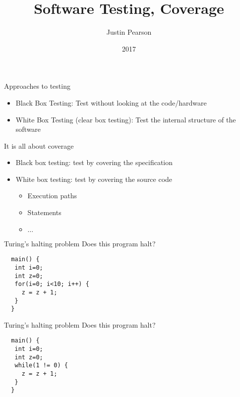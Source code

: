 \documentclass{beamer}
\title{Software Testing, Coverage}
\author{Justin Pearson}
\date{2017}
\begin{document}
\lstset{language=C}

\begin{frame}
  \maketitle
\end{frame}

\begin{frame}{Approaches to testing}
  \begin{itemize}
  \item Black Box Testing: Test without looking at the code/hardware
  \item White Box Testing (clear box testing):  Test the internal
    structure of the software
  \end{itemize}
\end{frame}
\begin{frame}{It is all about coverage}
  \begin{itemize}
  \item Black box testing: test by covering the specification
  \item White box testing: test by covering the source code
    \begin{itemize}
    \item Execution paths
    \item Statements
    \item $\ldots$
    \end{itemize}
  \end{itemize}
\end{frame}

\begin{frame}[fragile]{Turing's halting problem}
Does this program halt?
\begin{lstlisting}
  main() {
   int i=0;
   int z=0;
   for(i=0; i<10; i++) {
     z = z + 1;
   }
  }
\end{lstlisting}
\end{frame}
\begin{frame}[fragile]{Turing's halting problem}
Does this program halt?
\begin{lstlisting}
  main() {
   int i=0;
   int z=0;
   while(1 != 0) {
     z = z + 1;
   }
  }
\end{lstlisting}
\end{frame}
\end{document}
